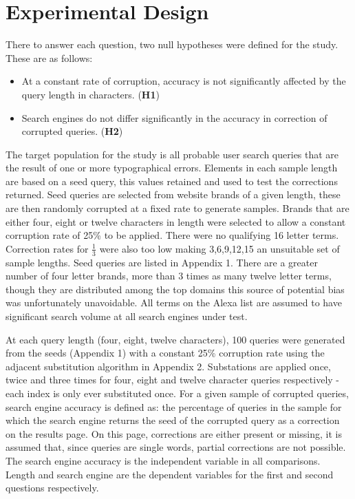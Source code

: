 \documentclass{csfourzero}
\begin{document}
\section{Experimental Design}
\label{sec:exp}

There to answer each question, two null hypotheses were defined for the study. These are as follows:
\begin{itemize}
  \item{At a constant rate of corruption, accuracy is not significantly affected by the query length in characters. (\textbf{H1})}
  \item{Search engines do not differ significantly in the accuracy in correction of corrupted queries. (\textbf{H2})}
\end{itemize}

\noindent
The target population for the study is all probable user search queries that are the result of one or more typographical errors. Elements in each sample length are based on a seed query, this values retained and used to test the corrections returned. Seed queries are selected from website brands of a given length, these are then randomly corrupted at a fixed rate to generate samples. Brands that are either four, eight or twelve characters in length were selected to allow a constant corruption rate of 25\% to be applied. There were no qualifying 16 letter terms. Correction rates for $\frac{1}{3}$ were also too low making 3,6,9,12,15 an unsuitable set of sample lengths. Seed queries are listed in Appendix 1. There are a greater number of four letter brands, more than 3 times as many twelve letter terms, though they are distributed among the top domains this source of potential bias was unfortunately unavoidable. All terms on the Alexa list are assumed to have significant search volume at all search engines under test.

At each query length (four, eight, twelve characters), 100 queries were generated from the seeds (Appendix 1) with a constant 25\% corruption rate using the adjacent substitution algorithm in Appendix 2. Substations are applied once, twice and three times for four, eight and twelve character queries respectively - each index is only ever substituted once. For a given sample of corrupted queries, search engine accuracy is defined as: the percentage of queries in the sample for which the search engine returns the seed of the corrupted query as a correction on the results page. On this page, corrections are either present or missing, it is assumed that, since queries are single words, partial corrections are not possible. The search engine accuracy is the independent variable in all comparisons. Length and search engine are the dependent variables for the first and second questions respectively.
\end{document}
